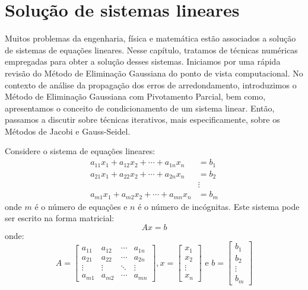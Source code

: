 
%

\chapter{Solução de sistemas lineares}

Muitos problemas da engenharia, física e matemática estão associados a solução de sistemas de equações lineares. Nesse capítulo, tratamos de técnicas numéricas empregadas para obter a solução desses sistemas. Iniciamos por uma rápida revisão do Método de Eliminação Gaussiana do ponto de vista computacional. No contexto de análise da propagação dos erros de arredondamento, introduzimos o Método de Eliminação Gaussiana com Pivotamento Parcial, bem como, apresentamos o conceito de condicionamento de um sistema linear. Então, passamos a discutir sobre técnicas iterativos, mais especificamente, sobre os Métodos de Jacobi e Gauss-Seidel.


Considere o sistema de equações lineares:
\begin{align*}
a_{11}x_1 + a_{12}x_2 + \cdots +a_{1n}x_n &= b_1\\
a_{21}x_1 + a_{22}x_2 + \cdots +a_{2n}x_n &= b_2\\
                                      &\vdots \\
a_{m1}x_1 + a_{m2}x_2 + \cdots +a_{mn}x_n &= b_m
\end{align*}
onde $m$ é o número de equações e $n$ é o número de incógnitas.  Este sistema pode ser escrito na forma matricial:
\begin{equation*}
  Ax = b
\end{equation*}
onde:
\begin{equation*}
  A=\begin{bmatrix}
a_{11} & a_{12} & \cdots & a_{1n}\\
a_{21} & a_{22} & \cdots & a_{2n}\\
\vdots & \vdots & \ddots & \vdots\\
a_{m1} & a_{m2} & \cdots & a_{mn}
\end{bmatrix},
x=\begin{bmatrix}
x_{1} \\
x_{2} \\
\vdots \\
x_{n}
\end{bmatrix}
 \text{ e } b=\begin{bmatrix}
b_{1} \\
b_{2} \\
\vdots \\
b_{m}
\end{bmatrix}
\end{equation*}

